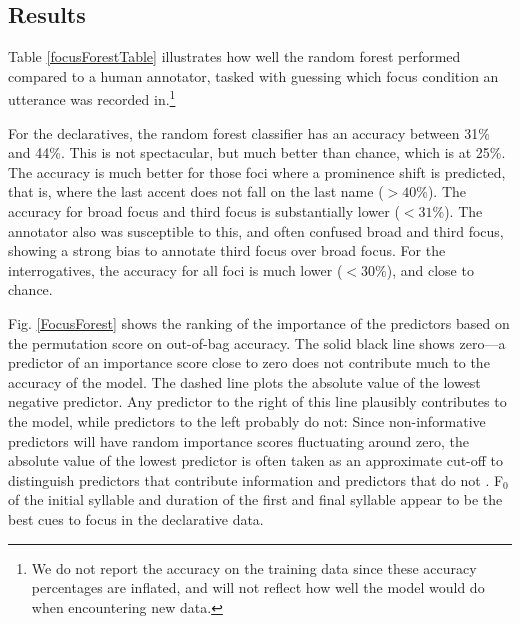 \documentclass[preprint,review,12pt,authoryear,times]{elsarticle}
\begin{document}
\subsection{Results}

Table \ref{focusForestTable} illustrates how well the random forest performed compared to a human annotator, tasked with guessing which focus condition an utterance was recorded in.\footnote{We do not report the accuracy on the training data since these accuracy percentages are inflated, and will not reflect how well the model would do when encountering new data. %
}



For the declaratives, the random forest classifier has an accuracy between  31\%  and 44\%. This is not spectacular, but much better than chance, which is at 25\%. The accuracy is much better for those foci where a prominence shift is predicted, that is, where the last accent does not fall on the last name ($>40\%$). The accuracy for broad focus and third focus is substantially lower ($<31\%$). The annotator also was susceptible to this, and often confused broad and third focus, showing a strong bias to annotate third focus over broad focus.  For the interrogatives, the accuracy for all foci is much lower ($<30\%$), and close to chance. 

Fig. \ref{FocusForest} shows the ranking of the importance of the predictors based on the permutation score on out-of-bag accuracy. The solid black line shows zero---a predictor of an importance score close to zero does not contribute much to the accuracy of the model. The dashed line plots the absolute value of the lowest negative predictor. Any predictor to the right of this line plausibly contributes to the model, while predictors to the left probably do not: Since non-informative predictors will have random importance scores fluctuating around zero, the absolute value of the lowest predictor is often taken as an approximate cut-off  to distinguish predictors that contribute information and predictors that do not \citep{strob09}. F$_0$ of the initial syllable and duration of the first and final syllable appear to be the best cues to focus in the declarative data. 
\end{document}
